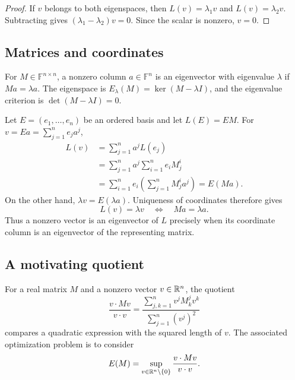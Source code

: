 \begin{proof}
  If \(v\) belongs to both eigenspaces, then
  \(L(v)=\lambda_1v\) and \(L(v)=\lambda_2v\). Subtracting gives
  \((\lambda_1-\lambda_2)v=0\). Since the scalar is nonzero,
  \(v=0\).
\end{proof}



\subsection{Matrices and coordinates}

For \(M\in\mathbb F^{n\times n}\), a nonzero column \(a\in\mathbb F^n\)
is an eigenvector with eigenvalue \(\lambda\) if \(Ma=\lambda a\).
The eigenspace is \(E_\lambda(M)=\ker(M-\lambda I)\), and the
eigenvalue criterion is \(\det(M-\lambda I)=0\).

Let \(E=(e_1,\ldots,e_n)\) be an ordered basis and let \(L(E)=EM\).
For \(v=Ea=\sum_{j=1}^n e_ja^j\),
\begin{align*}
  L(v)&=\sum_{j=1}^n a^jL(e_j)\\
    &=\sum_{j=1}^n a^j\sum_{i=1}^n e_iM^i_j\\
    &=\sum_{i=1}^n e_i\left(\sum_{j=1}^n M^i_ja^j\right)
      =E(Ma).
\end{align*}
On the other hand, \(\lambda v=E(\lambda a)\). Uniqueness of coordinates
therefore gives
\[
  L(v)=\lambda v\quad\Longleftrightarrow\quad Ma=\lambda a.
\]
Thus a nonzero vector is an eigenvector of \(L\) precisely when its
coordinate column is an eigenvector of the representing matrix.

\subsection{A motivating quotient}

For a real matrix \(M\) and a nonzero vector \(v\in\mathbb{R}^n\), the quotient
\[
  \frac{v\cdot Mv}{v\cdot v}
    =\frac{\displaystyle\sum_{j,k=1}^n v^jM^j_kv^k}
      {\displaystyle\sum_{j=1}^n(v^j)^2}
\]
compares a quadratic expression with the squared length of \(v\).
The associated optimization problem is to consider
\[
  E(M)=\sup_{v\in\mathbb{R}^n\setminus\{0\}}
    \frac{v\cdot Mv}{v\cdot v}.
\]
